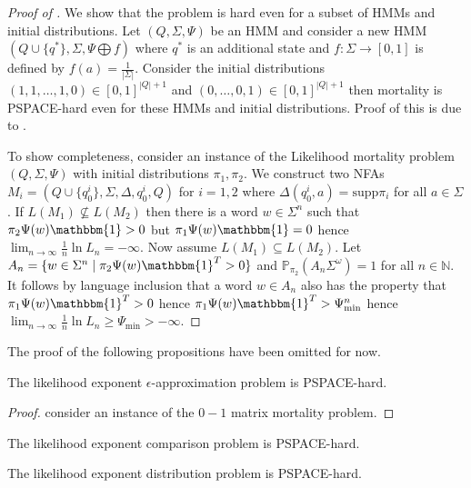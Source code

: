 \documentclass[a4paper,UKenglish,cleveref, autoref,mathscr]{lipics-v2019}
\newcommand{\NN}{\mathbb{N}}
\newcommand{\PP}{\mathbb{P}}
\newcommand{\1}{\mathbbm{1}}
\newcommand{\supp}{\mathrm{supp}}
\newcommand{\liexp}{\lim_{n\rightarrow\infty} \frac1n \ln L_n}
\begin{document}
\begin{proof}[Proof of ]
We show that the problem is hard even for a subset of HMMs and initial distributions. Let $(Q, \Sigma, \Psi)$ be an HMM and consider a new HMM
$(Q \cup \{q^*\}, \Sigma, \Psi \bigoplus f)$ where $q^*$ is an additional state and $f : \Sigma \rightarrow [0,1]$ is defined by $f(a) = \frac{1}{|\Sigma|}$. Consider the initial distributions $(1, 1, \dots, 1, 0) \in [0,1]^{|Q| + 1}$ and $(0, \dots, 0, 1) \in [0,1]^{|Q| + 1}$ then mortality is PSPACE-hard even for these HMMs and initial distributions. Proof of this is due to \cite{karasha09}.

To show completeness, consider an instance of the Likelihood mortality problem $(Q, \Sigma, \Psi)$ with initial distributions $\pi_1, \pi_2$. We construct two NFAs $M_i = (Q \cup \{q_0^i\}, \Sigma, \Delta, q_0^i, Q)$ for $i = 1, 2$ where $\Delta(q_0^i, a) = \supp \pi_i$ for all $a \in \Sigma$. If $L(M_1) \not\subseteq L(M_2)$ then there is a word $w \in \Sigma^n$ such that $\pi_2 \Psi(w) \1 > 0$ but $\pi_1 \Psi(w) \1 = 0$ hence $\liexp = -\infty$. Now assume $L(M_1) \subseteq L(M_2)$. Let $A_n = \{ w \in \Sigma^n \mid \pi_2 \Psi(w) \1^T > 0 \}$ and $\PP_{\pi_2}(A_n \Sigma^\omega) = 1$ for all $n \in \NN$. It follows by language inclusion that a word $w \in A_n$ also has the property that $\pi_1 \Psi(w) \1^T > 0$ hence $\pi_1 \Psi(w) \1^T > \Psi_{\text{min}}^n$ hence $\liexp \geq \Psi_{\text{min}} > -\infty$.
\end{proof}

The proof of the following propositions have been omitted for now.

\begin{proposition}
The likelihood exponent $\epsilon$-approximation problem is PSPACE-hard. 
\end{proposition}

\begin{proof}
consider an instance of the $0-1$ matrix mortality problem. 
\end{proof}

\begin{proposition}
The likelihood exponent comparison problem is PSPACE-hard. 
\end{proposition}

\begin{proposition}
The likelihood exponent distribution problem is PSPACE-hard. 
\end{proposition}
\end{document}

